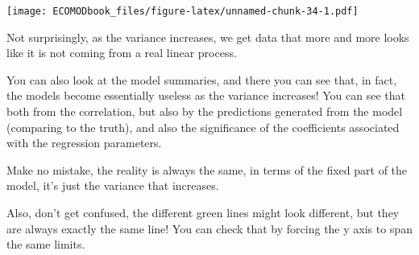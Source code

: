 \documentclass[
]{book}
\begin{document}
\texttt{[image: ECOMODbook\_files/figure-latex/unnamed-chunk-34-1.pdf]}

Not surprisingly, as the variance increases, we get data that more and more looks like it is not coming from a real linear process.

You can also look at the model summaries, and there you can see that, in fact, the models become essentially useless as the variance increases! You can see that both from the correlation, but also by the predictions generated from the model (comparing to the truth), and also the significance of the coefficients associated with the regression parameters.

Make no mistake, the reality is always the same, in terms of the fixed part of the model, it's just the variance that increases.

Also, don't get confused, the different green lines might look different, but they are always exactly the same line! You can check that by forcing the y axis to span the same limits.
\end{document}
